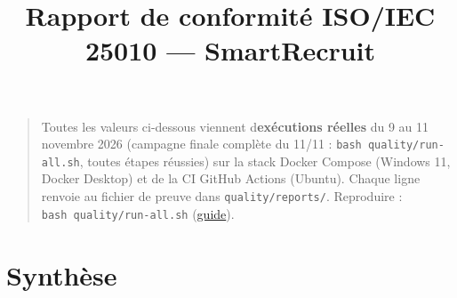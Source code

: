 \documentclass[
  11pt,
]{article}
\title{Rapport de conformité ISO/IEC 25010 --- SmartRecruit}
\author{}
\date{}
\let\tdmorigine\tableofcontents
\renewcommand{\tableofcontents}{\tdmorigine\newpage}
\begin{document}
\maketitle

\renewcommand*\contentsname{Table des matières}
{
\hypersetup{linkcolor=}
\setcounter{tocdepth}{3}
\tableofcontents
}
\begin{quote}
Toutes les valeurs ci-dessous viennent
d\textquotesingle{}\textbf{exécutions réelles} du 9 au 11 novembre 2026
(campagne finale complète du 11/11 :
\texttt{bash\ quality/}\allowbreak{}\texttt{run-}\allowbreak{}\texttt{all.}\allowbreak{}\texttt{sh},
toutes étapes réussies) sur la stack Docker Compose (Windows 11, Docker
Desktop) et de la CI GitHub Actions (Ubuntu). Chaque ligne renvoie au
fichier de preuve dans \texttt{quality/reports/}. Reproduire :
\texttt{bash\ quality/}\allowbreak{}\texttt{run-}\allowbreak{}\texttt{all.}\allowbreak{}\texttt{sh}
(\href{GUIDE_INSTALLATION.pdf}{guide}).
\end{quote}

\section{Synthèse}\label{synthuxe8se}
\end{document}
